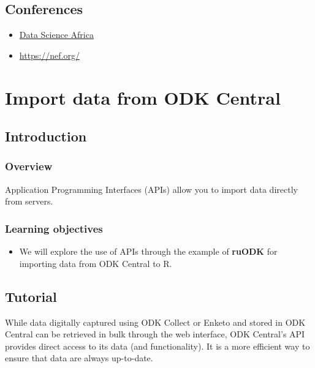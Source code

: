 \documentclass[
  letterpaper,
  DIV=11,
  numbers=noendperiod,
  oneside]{scrreprt}
\providecommand{\tightlist}{%
  \setlength{\itemsep}{0pt}\setlength{\parskip}{0pt}}\usepackage{longtable,booktabs,array}
\begin{document}
\hypertarget{conferences}{%
\section{Conferences}\label{conferences}}

\begin{itemize}
\item
  \href{http://www.datascienceafrica.org/}{Data Science Africa}
\item
  \url{https://nef.org/}
\end{itemize}

\hypertarget{import-data-from-odk-central}{%
\chapter{Import data from ODK
Central}\label{import-data-from-odk-central}}

\hypertarget{introduction-18}{%
\section{Introduction}\label{introduction-18}}

\hypertarget{overview-11}{%
\subsection{Overview}\label{overview-11}}

Application Programming Interfaces (APIs) allow you to import data
directly from servers.

\hypertarget{learning-objectives-12}{%
\subsection{Learning objectives}\label{learning-objectives-12}}

\begin{itemize}
\tightlist
\item
  We will explore the use of APIs through the example of \textbf{ruODK}
  for importing data from ODK Central to R.
\end{itemize}

\hypertarget{tutorial}{%
\section{Tutorial}\label{tutorial}}

While data digitally captured using ODK Collect or Enketo and stored in
ODK Central can be retrieved in bulk through the web interface, ODK
Central's API provides direct access to its data (and functionality). It
is a more efficient way to ensure that data are always up-to-date.
\end{document}
